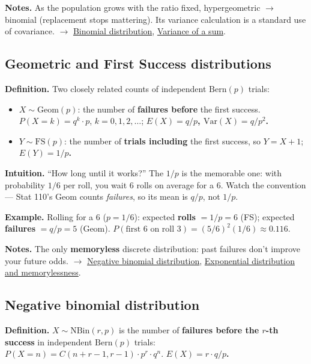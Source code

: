 \documentclass[11pt,a4paper]{article}
\begin{document}
\textbf{Notes.} As the population grows with the ratio fixed, hypergeometric $\to$ binomial (replacement stops mattering). Its variance calculation is a standard use of covariance. $\to$ \hyperref[sec:binomial-distribution]{Binomial distribution}, \hyperref[sec:variance-of-a-sum]{Variance of a sum}.

\subsection{Geometric and First Success distributions}\label{sec:geometric-and-first-success-distributions}

\textbf{Definition.} Two closely related counts of independent $\mathrm{Bern}(p)$ trials:
\begin{itemize}[leftmargin=1.4em]
\item $X \sim \mathrm{Geom}(p)$: the number of \textbf{failures before} the first success. $P(X = k) = q^{k}\cdot p$, $k = 0, 1, 2, \ldots$; \textbf{$E(X) = q/p$, $\mathrm{Var}(X) = q/p^{2}$.}
\item $Y \sim \mathrm{FS}(p)$: the number of \textbf{trials including} the first success, so $Y = X + 1$; \textbf{$E(Y) = 1/p$.}
\end{itemize}

\textbf{Intuition.} ``How long until it works?'' The $1/p$ is the memorable one: with probability $1/6$ per roll, you wait 6 rolls on average for a 6. Watch the convention --- Stat 110's $\mathrm{Geom}$ counts \textit{failures}, so its mean is $q/p$, not $1/p$.

\textbf{Example.} Rolling for a 6 ($p = 1/6$): expected \textbf{rolls} $= 1/p = 6$ (FS); expected \textbf{failures} $= q/p = 5$ (Geom). $P(\text{first 6 on roll 3}) = (5/6)^{2}(1/6) \approx  0.116$.

\textbf{Notes.} The only \textbf{memoryless} discrete distribution: past failures don't improve your future odds. $\to$ \hyperref[sec:negative-binomial-distribution]{Negative binomial distribution}, \hyperref[sec:exponential-distribution-and-memorylessness]{Exponential distribution and memorylessness}.

\subsection{Negative binomial distribution}\label{sec:negative-binomial-distribution}

\textbf{Definition.} $X \sim \mathrm{NBin}(r, p)$ is the number of \textbf{failures before the $r$-th success} in independent $\mathrm{Bern}(p)$ trials:
$P(X = n) = C(n + r - 1, r - 1)\cdot p^{r}\cdot q^{n}$. \textbf{$E(X) = r\cdot q/p$.}
\end{document}
